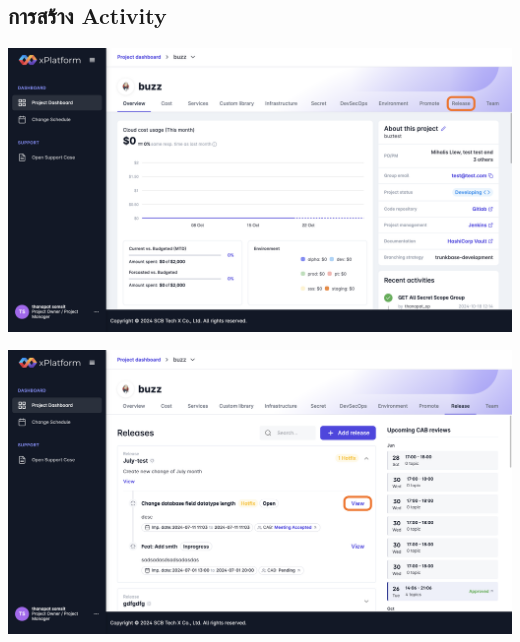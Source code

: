 \subsection{การสร้าง Activity}
\begin{center}
    \includegraphics[width=\linewidth]{resources/pages/change-runbook/create-activity/1.png}

    \vspace{1in}

    \includegraphics[width=\linewidth]{resources/pages/change-runbook/create-activity/2.png}
\end{center}
